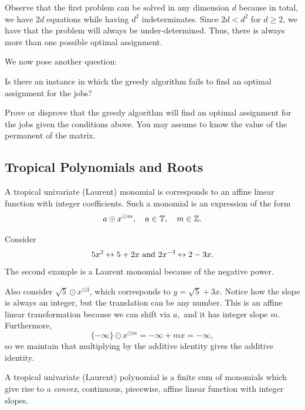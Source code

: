 \documentclass[12pt]{memoir}
\theoremstyle{definition}
\begin{document}
\begin{Rmk}
Observe that the first problem can be solved in any dimension $d$ because in total, we have $2d$ equations while having $d^2$ indeterminates. Since $2d<d^2$ for $d\geq 2$, we have that the problem will always be under-determined. Thus, there is always more than one possible optimal assignment. 
\end{Rmk}

We now pose another question: 
\begin{significant}
    Is there an instance in which the greedy algorithm fails to find an optimal assignment for the jobs?
\end{significant}

\begin{Ej}
Prove or disprove that the greedy algorithm will find an optimal assignment for the jobs given the conditions above. You may assume to know the value of the permanent of the matrix.
\end{Ej}


\subsection{Tropical Polynomials and Roots}

A tropical univariate (Laurent) monomial is corresponds to an affine linear function with integer coefficients. Such a monomial is an expression of the form 
$$a\odot x^{\odot m},\quad a\in\mathbb{T},\quad m\in\mathbb{Z}.$$

\begin{Ex}
    Consider
    $$5x^2\leftrightarrow 5+2x\text{ and } 2x^{-3}\leftrightarrow 2-3x.$$
    The second example is a Laurent monomial because of the negative power.\par
    Also consider $\sqrt 5\odot x^{\odot 3}$, which corresponds to $y=\sqrt{5}+3x$. Notice how the slope is always an integer, but the translation can be any number. This is an affine linear transformation because we can shift via $a,$ and it has integer slope $m.$ Furthermore, $$\{-\infty\}\odot x^{\odot m} = -\infty + mx = - \infty,$$ so we maintain that multiplying by the additive identity gives the additive identity.
\end{Ex}

A tropical univariate (Laurent) polynomial is a finite sum of monomials which give rise to a \emph{convex}, continuous, piecewise, affine linear function with integer slopes. 
\end{document}
